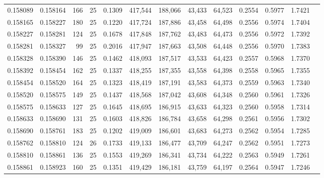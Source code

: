 \begin{tabular}{rrrrrrrrrrrrr}
0.158089 & 0.158164 &   166 &  25 &                                     0.1309 & 417,544 & 188,066 &  43,433 &  64,523 & 0.2554 & 0.5977 & 1.7421 \\
0.158165 & 0.158227 &   180 &  25 &                                     0.1220 & 417,724 & 187,886 &  43,458 &  64,498 & 0.2556 & 0.5974 & 1.7404 \\
0.158227 & 0.158281 &   124 &  25 &                                     0.1678 & 417,848 & 187,762 &  43,483 &  64,473 & 0.2556 & 0.5972 & 1.7392 \\
0.158281 & 0.158327 &    99 &  25 &                                     0.2016 & 417,947 & 187,663 &  43,508 &  64,448 & 0.2556 & 0.5970 & 1.7383 \\
0.158328 & 0.158390 &   146 &  25 &                                     0.1462 & 418,093 & 187,517 &  43,533 &  64,423 & 0.2557 & 0.5968 & 1.7370 \\
0.158392 & 0.158454 &   162 &  25 &                                     0.1337 & 418,255 & 187,355 &  43,558 &  64,398 & 0.2558 & 0.5965 & 1.7355 \\
0.158454 & 0.158520 &   164 &  25 &                                     0.1323 & 418,419 & 187,191 &  43,583 &  64,373 & 0.2559 & 0.5963 & 1.7340 \\
0.158520 & 0.158575 &   149 &  25 &                                     0.1437 & 418,568 & 187,042 &  43,608 &  64,348 & 0.2560 & 0.5961 & 1.7326 \\
0.158575 & 0.158633 &   127 &  25 &                                     0.1645 & 418,695 & 186,915 &  43,633 &  64,323 & 0.2560 & 0.5958 & 1.7314 \\
0.158633 & 0.158690 &   131 &  25 &                                     0.1603 & 418,826 & 186,784 &  43,658 &  64,298 & 0.2561 & 0.5956 & 1.7302 \\
0.158690 & 0.158761 &   183 &  25 &                                     0.1202 & 419,009 & 186,601 &  43,683 &  64,273 & 0.2562 & 0.5954 & 1.7285 \\
0.158762 & 0.158810 &   124 &  26 &                                     0.1733 & 419,133 & 186,477 &  43,709 &  64,247 & 0.2562 & 0.5951 & 1.7273 \\
0.158810 & 0.158861 &   136 &  25 &                                     0.1553 & 419,269 & 186,341 &  43,734 &  64,222 & 0.2563 & 0.5949 & 1.7261 \\
0.158861 & 0.158923 &   160 &  25 &                                     0.1351 & 419,429 & 186,181 &  43,759 &  64,197 & 0.2564 & 0.5947 & 1.7246 \\

\end{tabular}
